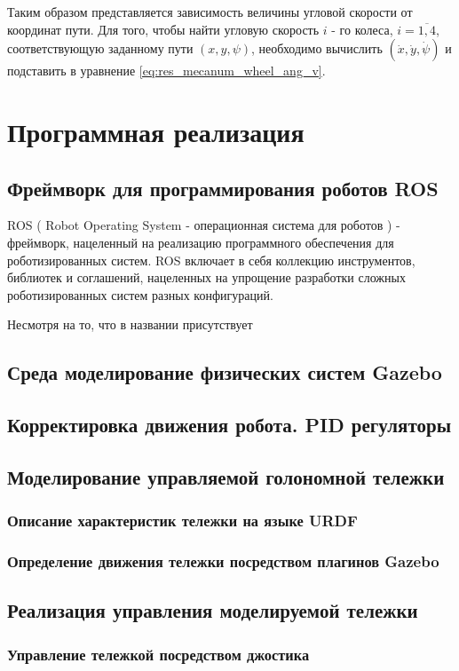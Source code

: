 \documentclass[oneside,final,14pt]{extreport}
\begin{document}
Таким образом представляется зависимость величины угловой скорости от координат пути. Для того, чтобы найти угловую скорость $i$ - го колеса, $i=\overline{1,4}$, соответствующую заданному пути $(x,y,\psi)$, необходимо вычислить $(\dot{x},\dot{y},\dot{\psi})$ и подставить в уравнение \ref{eq:res_mecanum_wheel_ang_v}.

\chapter{Программная реализация}
\section{Фреймворк для программирования роботов ROS }
ROS ( Robot Operating System  -  операционная система для роботов ) -  фреймворк, нацеленный на реализацию программного обеспечения для роботизированных систем\cite{ros.org}.  ROS включает в себя коллекцию инструментов, библиотек и соглашений, нацеленных на упрощение разработки сложных роботизированных систем разных конфигураций. 

Несмотря на то, что в названии присутствует 
\section{Среда моделирование физических систем Gazebo}
\section{Корректировка движения робота. PID регуляторы}
\section{Моделирование управляемой голономной тележки}
\subsection{Описание характеристик тележки на языке URDF}
\subsection{Определение движения тележки посредством плагинов Gazebo}
\section{Реализация управления моделируемой тележки}
\subsection{Управление тележкой посредством джостика}
\end{document}
